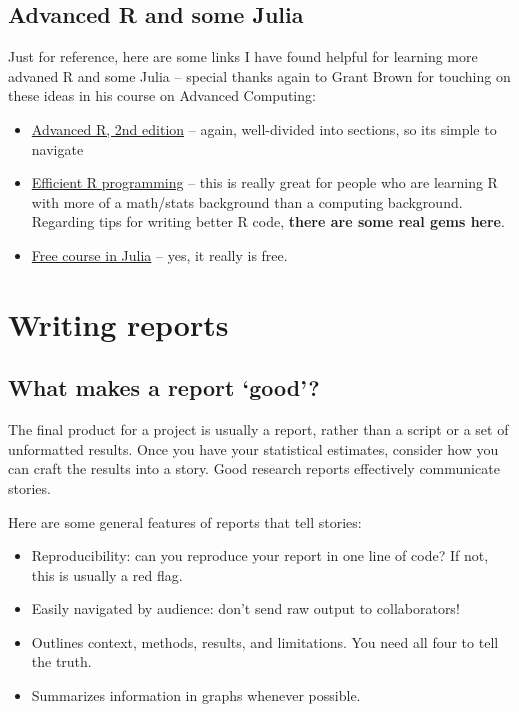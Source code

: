 \documentclass[
]{book}
\begin{document}
\hypertarget{advanced-r-and-some-julia}{%
\section{Advanced R and some Julia}\label{advanced-r-and-some-julia}}

Just for reference, here are some links I have found helpful for learning more advaned R and some Julia -- special thanks again to Grant Brown for touching on these ideas in his course on Advanced Computing:

\begin{itemize}
\item
  \href{https://adv-r.hadley.nz/}{Advanced R, 2nd edition} -- again, well-divided into sections, so its simple to navigate
\item
  \href{https://bookdown.org/csgillespie/efficientR/programming.html}{Efficient R programming} -- this is really great for people who are learning R with more of a math/stats background than a computing background. Regarding tips for writing better R code, \textbf{there are some real gems here}.
\item
  \href{https://juliaacademy.com/p/intro-to-julia}{Free course in Julia} -- yes, it really is free.
\end{itemize}

\hypertarget{writing-reports}{%
\chapter{Writing reports}\label{writing-reports}}

\hypertarget{what-makes-a-report-good}{%
\section{What makes a report `good'?}\label{what-makes-a-report-good}}

The final product for a project is usually a report, rather than a script or a set of unformatted results. Once you have your statistical estimates, consider how you can craft the results into a story. Good research reports effectively communicate stories.

Here are some general features of reports that tell stories:

\begin{itemize}
\item
  Reproducibility: can you reproduce your report in one line of code? If not, this is usually a red flag.
\item
  Easily navigated by audience: don't send raw output to collaborators!
\item
  Outlines context, methods, results, and limitations. You need all four to tell the truth.
\item
  Summarizes information in graphs whenever possible.
\end{itemize}
\end{document}
